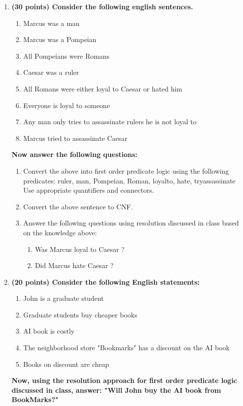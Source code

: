 \documentclass{article}%
\begin{document}
\begin{enumerate}
\item \textbf{(30 points) Consider the following english sentences.}
	\begin{enumerate}
	\item Marcus was a man
	\item Marcus was a Pompeian
	\item All Pompeians were Romans
	\item Caesar was a ruler
	\item All Romans were either loyal to Caesar or hated him
	\item Everyone is loyal to someone
	\item Any man only tries to assassinate rulers he is not loyal to
	\item Marcus tried to assassinate Caesar
	\end{enumerate}

\textbf{Now answer the following questions:}

	\begin{enumerate}
	\item Convert the above into first order predicate logic using the following predicates: ruler, man, Pompeian, Roman, loyalto, hate, tryassassinate Use appropriate quantifiers and connectors.
	\item Convert the above sentence to CNF.
	\item Answer the following questions using resolution discussed in class based on the knowledge above:
		\begin{enumerate}
		\item Was Marcus loyal to Caesar ?
		\item Did Marcus hate Caesar ?
		\end{enumerate}

	\end{enumerate}

\item \textbf{(20 points) Consider the following English statements:}
	\begin{enumerate}
	\item John is a graduate student
	\item Graduate students buy cheaper books
	\item AI book is costly
	\item The neighborhood store "Bookmarks" has a discount on the AI book
	\item Books on discount are cheap
	\end{enumerate}

\textbf{Now, using the resolution approach for first order predicate logic discussed in class, answer: "Will John buy the AI book from BookMarks?"}

\end{enumerate}
\end{document}
